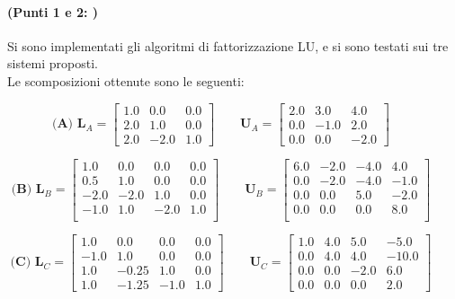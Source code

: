 \documentclass[letterpaper, 12pt]{article}
\begin{document}
\paragraph{(Punti 1 e 2: )} Si sono implementati gli algoritmi di fattorizzazione LU, e si sono testati 
sui tre sistemi proposti. \\
Le scomposizioni ottenute sono le seguenti: \newline
    \begin{center}
    
    \[
    \textbf{(A)    }
    \mathbf{L}_A =
    \begin{bmatrix}
    1.0  & 0.0 & 0.0 \\
    2.0  & 1.0 & 0.0 \\
    2.0  & -2.0 & 1.0
    \end{bmatrix}
    \qquad
    \mathbf{U}_A =
    \begin{bmatrix}
    2.0 &  3.0  & 4.0 \\
    0.0  & -1.0  & 2.0 \\
    0.0  & 0.0   & -2.0
    \end{bmatrix}
    \qquad
    \]

    \[
    \textbf{(B)   }
    \mathbf{L}_B =
    \begin{bmatrix}
    1.0  & 0.0   & 0.0  & 0.0 \\
    0.5  & 1.0   & 0.0  & 0.0 \\
    -2.0  & -2.0  & 1.0  & 0.0 \\
    -1.0  & 1.0   & -2.0 & 1.0 \\
    \end{bmatrix}
    \qquad
    \mathbf{U}_B =
    \begin{bmatrix}
    6.0  & -2.0  & -4.0  & 4.0  \\
    0.0  & -2.0  & -4.0  & -1.0 \\
    0.0  & 0.0   & 5.0   & -2.0 \\
    0.0  & 0.0   & 0.0   & 8.0  \\
    \end{bmatrix}
    \qquad
    \]

    \[
    \textbf{(C)   }
    \mathbf{L}_C =
    \begin{bmatrix}
    1.0  & 0.0   & 0.0  & 0.0 \\
    -1.0  & 1.0   & 0.0  & 0.0 \\
    1.0  & -0.25 & 1.0  & 0.0 \\
    1.0  & -1.25 & -1.0 & 1.0 
    \end{bmatrix}
    \qquad
    \mathbf{U}_C =
    \begin{bmatrix}
    1.0  & 4.0   & 5.0  & -5.0 \\
    0.0  & 4.0   & 4.0  & -10.0 \\
    0.0  & 0.0   & -2.0 & 6.0 \\
    0.0  & 0.0   & 0.0  & 2.0 
    \end{bmatrix}
    \qquad
    \]
    \end{center}
\end{document}
